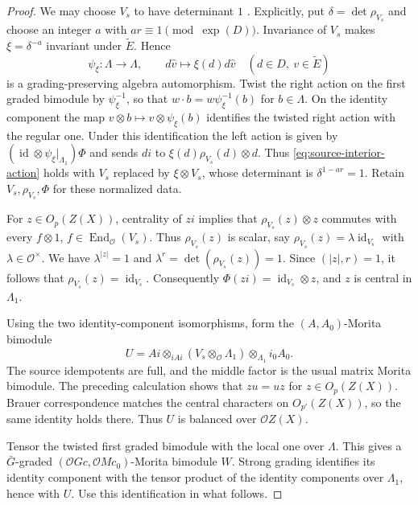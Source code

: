 \documentclass[11pt,a4paper]{article}
\theoremstyle{definition}
\theoremstyle{remark}
\numberwithin{equation}{section}
\newcommand{\cO}{\mathcal{O}}
\DeclareMathOperator{\End}{End}
\DeclareMathOperator{\id}{id}
\begin{document}
\begin{proof}
		We may choose $V_s$ to have determinant $1$
		\cite[p.~446]{LassueurThevenaz2019}. Explicitly, put
		$\delta=\det\rho_{V_s}$ and choose an integer $a$ with
		$ar\equiv1\pmod{\exp(D)}$. Invariance of $V_s$ makes
		$\xi=\delta^{-a}$ invariant under $\widetilde E$. Hence
		\[
		\psi_\xi:\Lambda\longrightarrow\Lambda,\qquad
		d\widehat v\longmapsto\xi(d)d\widehat v
		\quad(d\in D,\ v\in\widetilde E)
		\]
		is a grading-preserving algebra automorphism. Twist the right action on
		the first graded bimodule by $\psi_\xi^{-1}$, so that $w\cdot b=w\psi_\xi^{-1}(b)$ for $b\in\Lambda$.
		On the identity component the map $v\otimes b\mapsto v\otimes\psi_\xi(b)$ identifies
		the twisted right action with the regular one. Under this identification the left action
		is given by $(\id\otimes\psi_\xi|_{\Lambda_1})\Phi$ and sends $di$ to
		$\xi(d)\rho_{V_s}(d)\otimes d$. Thus \eqref{eq:source-interior-action} holds
		with $V_s$ replaced by $\xi\otimes V_s$, whose determinant is $\delta^{1-ar}=1$.
		Retain $V_s,\rho_{V_s},\Phi$ for these normalized data.
		
		For $z\in O_p(Z(X))$, centrality of $zi$ implies that
		$\rho_{V_s}(z)\otimes z$ commutes with every
		$f\otimes1$, $f\in\End_\cO(V_s)$. Thus $\rho_{V_s}(z)$ is
		scalar, say $\rho_{V_s}(z)=\lambda\id_{V_s}$ with
		$\lambda\in\cO^\times$. We have
		$\lambda^{|z|}=1$ and $\lambda^r=\det(\rho_{V_s}(z))=1$.
		Since $(|z|,r)=1$, it follows that
		$\rho_{V_s}(z)=\id_{V_s}$. Consequently
		$\Phi(zi)=\id_{V_s}\otimes z$, and $z$ is central in $\Lambda_1$.
		
		Using the two identity-component isomorphisms, form the
		$(A,A_0)$-Morita bimodule
		\[
		U=Ai\otimes_{iAi}(V_s\otimes_\cO\Lambda_1)
		\otimes_{\Lambda_1}i_0A_0.
		\]
		The source idempotents are full, and the middle factor is the
		usual matrix Morita bimodule. The preceding calculation shows
		that $zu=uz$ for $z\in O_p(Z(X))$. Brauer correspondence
		matches the central characters on $O_{p'}(Z(X))$, so the same
		identity holds there. Thus $U$ is balanced over $\cO Z(X)$.
		
		Tensor the twisted first graded bimodule with the local one over $\Lambda$.
		This gives a $\bar G$-graded $(\cO Gc,\cO Mc_0)$-Morita bimodule $W$.
		Strong grading identifies its identity component with the tensor product
		of the identity components over $\Lambda_1$, hence with $U$.
		Use this identification in what follows.
		

\end{proof}
\end{document}
